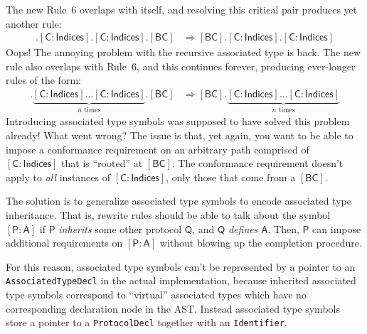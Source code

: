 \documentclass[headsepline,bibliography=totoc]{scrreport}
\newcommand{\namesym}[1]{\mathsf{#1}}
\newcommand{\proto}[1]{\bm{\mathsf{#1}}}
\newcommand{\protosym}[1]{[\proto{#1}]}
\newcommand{\assocsym}[2]{[\proto{#1}\colon\namesym{#2}]}
\theoremstyle{definition}
\theoremstyle{definition}
\theoremstyle{definition}
\begin{document}
The new Rule~6 overlaps with itself, and resolving this critical pair produces yet another rule:
\begin{align*}
\protosym{BC}.\assocsym{C}{Indices}.\assocsym{C}{Indices}.\protosym{BC}&\Rightarrow\protosym{BC}.\assocsym{C}{Indices}.\assocsym{C}{Indices}
\end{align*}
Oops! The annoying problem with the recursive associated type is back. The new rule also overlaps with Rule~6, and this continues forever, producing ever-longer rules of the form:
\begin{align*}
\protosym{BC}.\underbrace{\assocsym{C}{Indices}\ldots\assocsym{C}{Indices}}_{\text{$n$ times}}.\protosym{BC}
&\Rightarrow\protosym{BC}.\underbrace{\assocsym{C}{Indices}\ldots\assocsym{C}{Indices}}_{\text{$n$ times}}
\end{align*}
Introducing associated type symbols was supposed to have solved this problem already! What went wrong? The issue is that, yet again, you want to be able to impose a conformance requirement on an arbitrary path comprised of $\assocsym{C}{Indices}$ that is ``rooted'' at $\protosym{BC}$. The conformance requirement doesn't apply to \emph{all} instances of $\assocsym{C}{Indices}$, only those that come from a $\protosym{BC}$.

The solution is to generalize associated type symbols to encode associated type inheritance. That is, rewrite rules should be able to talk about the symbol $\assocsym{P}{A}$ if $\proto{P}$ \emph{inherits} some other protocol $\proto{Q}$, and $\proto{Q}$ \emph{defines} $\namesym{A}$. Then, $\proto{P}$ can impose additional requirements on $\assocsym{P}{A}$ without blowing up the completion procedure.

\begin{leftbar}
\noindent For this reason, associated type symbols can't be represented by a pointer to an \texttt{AssociatedTypeDecl} in the actual implementation, because inherited associated type symbols correspond to ``virtual'' associated types which have no corresponding declaration node in the AST. Instead associated type symbols store a pointer to a \texttt{ProtocolDecl} together with an \texttt{Identifier}.
\end{leftbar}
\end{document}
